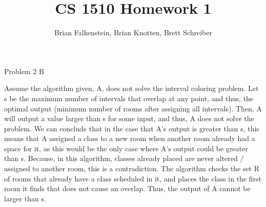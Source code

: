 \documentclass[11pt, oneside]{article}
\title{CS 1510 Homework 1}
\author{Brian Falkenstein, Brian Knotten, Brett Schreiber}
\begin{document}
\maketitle

{\noindent \large Problem 2 B \par}
Assume the algorithm given, A, does not solve the interval coloring problem. Let s be the maximum number of intervals that overlap at any point, and thus, the optimal output (minimum number of rooms after assigning all intervals). Then, A will output a value larger than s for some input, and thus, A does not solve the problem. We can conclude that in the case that A's output is greater than s, this means that A assigned a class to a new room when another room already had a space for it, as this would be the only case where A's output could be greater than s. Because, in this algorithm, classes already placed are never altered / assigned to another room, this is a contradiction. The algorithm checks the set R of rooms that already have a class scheduled in it, and places the class in the first room it finds that does not cause an overlap. Thus, the output of A cannot be larger than s. 
~\\ \par
\end{document}
